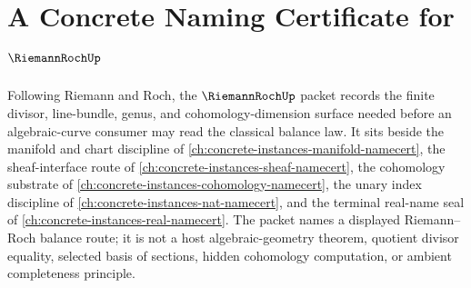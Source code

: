 \chapter{A Concrete Naming Certificate for $\RiemannRochUp$}
\label{ch:concrete-instances-riemann-roch-namecert}

Following Riemann and Roch, the $\RiemannRochUp$ packet records the finite divisor, line-bundle, genus, and cohomology-dimension surface needed before an algebraic-curve consumer may read the classical balance law. It sits beside the manifold and chart discipline of \autoref{ch:concrete-instances-manifold-namecert}, the sheaf-interface route of \autoref{ch:concrete-instances-sheaf-namecert}, the cohomology substrate of \autoref{ch:concrete-instances-cohomology-namecert}, the unary index discipline of \autoref{ch:concrete-instances-nat-namecert}, and the terminal real-name seal of \autoref{ch:concrete-instances-real-namecert}. The packet names a displayed Riemann--Roch balance route; it is not a host algebraic-geometry theorem, quotient divisor equality, selected basis of sections, hidden cohomology computation, or ambient completeness principle.

